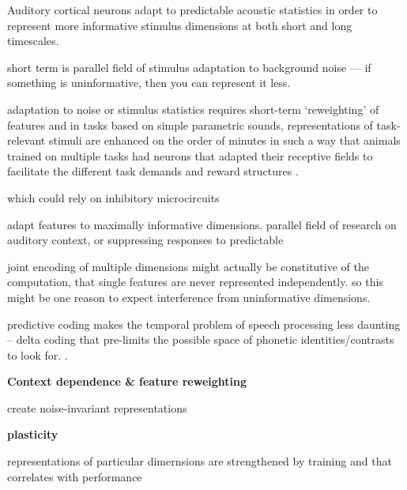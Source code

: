 Auditory cortical neurons adapt to predictable acoustic statistics in order to represent more informative stimulus dimensions at both short and long timescales. 

short term is parallel field of stimulus adaptation to background noise --- if something is uninformative, then you can represent it less. 

adaptation to noise or stimulus statistics requires short-term `reweighting' of features\cite{mesgaraniMechanismsNoiseRobust2014} and in tasks based on simple parametric sounds, representations of task-relevant stimuli are enhanced on the order of minutes\cite{fritzRapidTaskrelatedPlasticity2003a} in such a way that animals trained on multiple tasks had neurons that adapted their receptive fields to facilitate the different task demands\cite{fritzActiveListeningTaskdependent2005b} and reward structures\cite{davidTaskRewardStructure2012} .

which could rely on inhibitory microcircuits\cite{natanComplementaryControlSensory2015b,natanCorticalInterneuronsDifferentially2017}

adapt features to maximally informative dimensions\cite{Polley2006}. parallel field of research on auditory context, or suppressing responses to predictable 


joint encoding of multiple dimensions might actually be constitutive of the computation, that single features are never represented independently. \cite{macellaioWhySensoryNeurons2020} so this might be one reason to expect interference from uninformative dimensions.


predictive coding makes the temporal problem of speech processing less daunting -- delta coding that pre-limits the possible space of phonetic identities/contrasts to look for. .


\textbf{Context dependence \& feature reweighting}

create noise-invariant representations \cite{rabinowitzConstructingNoiseinvariantRepresentations2013}


\textbf{plasticity}

representations of particular dimernsions are strengthened by training\cite{irvinePlasticityAuditorySystem2018} and that correlates with performance\cite{bieszczadRepresentationalGainCortical2010}

